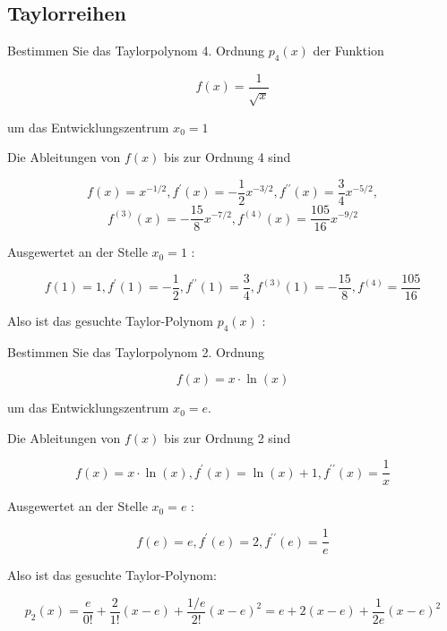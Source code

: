 \subsection*{Taylorreihen}

\begin{example}
    Bestimmen Sie das Taylorpolynom 4. Ordnung $p_{4}(x)$ der Funktion

    $$
    f(x)=\frac{1}{\sqrt{x}}
    $$
    
    um das Entwicklungszentrum $x_{0}=1$

    \tcblower

    Die Ableitungen von $f(x)$ bis zur Ordnung 4 sind

$$
f(x)=x^{-1 / 2}, f^{\prime}(x)=-\frac{1}{2} x^{-3 / 2}, f^{\prime \prime}(x)=\frac{3}{4} x^{-5 / 2}, $$$$f^{(3)}(x)=-\frac{15}{8} x^{-7 / 2}, f^{(4)}(x)=\frac{105}{16} x^{-9 / 2}
$$

Ausgewertet an der Stelle $x_{0}=1$ :

$$
f(1)=1, f^{\prime}(1)=-\frac{1}{2}, f^{\prime \prime}(1)=\frac{3}{4}, f^{(3)}(1)=-\frac{15}{8}, f^{(4)}=\frac{105}{16}
$$

Also ist das gesuchte Taylor-Polynom $p_{4}(x)$ :

\end{example}

\begin{example}
    Bestimmen Sie das Taylorpolynom 2. Ordnung

$$
f(x)=x \cdot \ln (x)
$$

um das Entwicklungszentrum $x_{0}=e$.
\tcblower

Die Ableitungen von $f(x)$ bis zur Ordnung 2 sind

$$
f(x)=x \cdot \ln (x), f^{\prime}(x)=\ln (x)+1, f^{\prime \prime}(x)=\frac{1}{x}
$$

Ausgewertet an der Stelle $x_{0}=e$ :

$$
f(e)=e, f^{\prime}(e)=2, f^{\prime \prime}(e)=\frac{1}{e}
$$

Also ist das gesuchte Taylor-Polynom:

$$
p_{2}(x)=\frac{e}{0!}+\frac{2}{1!}(x-e)+\frac{1 / e}{2!}(x-e)^{2}=e+2(x-e)+\frac{1}{2 e}(x-e)^{2}
$$

\end{example}

